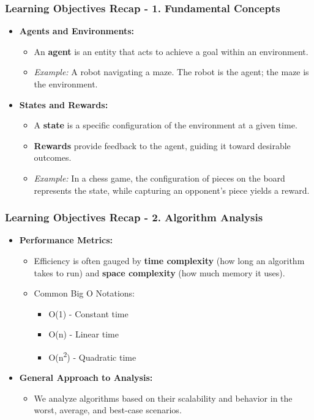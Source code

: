 \documentclass{beamer}
\begin{document}
\begin{frame}[fragile]
    \frametitle{Learning Objectives Recap - 1. Fundamental Concepts}
    \begin{itemize}
        \item \textbf{Agents and Environments:}
        \begin{itemize}
            \item An \textbf{agent} is an entity that acts to achieve a goal within an environment.
            \item \textit{Example:} A robot navigating a maze. The robot is the agent; the maze is the environment.
        \end{itemize}
        
        \item \textbf{States and Rewards:}
        \begin{itemize}
            \item A \textbf{state} is a specific configuration of the environment at a given time.
            \item \textbf{Rewards} provide feedback to the agent, guiding it toward desirable outcomes.
            \item \textit{Example:} In a chess game, the configuration of pieces on the board represents the state, while capturing an opponent's piece yields a reward.
        \end{itemize}
    \end{itemize}
\end{frame}

\begin{frame}[fragile]
    \frametitle{Learning Objectives Recap - 2. Algorithm Analysis}
    \begin{itemize}
        \item \textbf{Performance Metrics:}
        \begin{itemize}
            \item Efficiency is often gauged by \textbf{time complexity} (how long an algorithm takes to run) and \textbf{space complexity} (how much memory it uses).
            \item Common Big O Notations:
            \begin{itemize}
                \item O(1) - Constant time
                \item O(n) - Linear time
                \item O(n\textsuperscript{2}) - Quadratic time
            \end{itemize}
        \end{itemize}

        \item \textbf{General Approach to Analysis:}
        \begin{itemize}
            \item We analyze algorithms based on their scalability and behavior in the worst, average, and best-case scenarios.
        \end{itemize}
    \end{itemize}
\end{frame}
\end{document}
